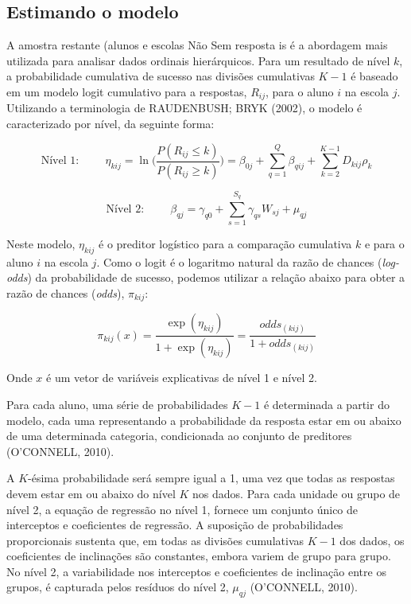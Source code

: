 \documentclass[
]{article}
\begin{document}
\hypertarget{estimando-o-modelo}{%
\subsection{Estimando o modelo}\label{estimando-o-modelo}}

A amostra restante (alunos e escolas Não Sem resposta is é a abordagem
mais utilizada para analisar dados ordinais hierárquicos. Para um
resultado de nível \(k\), a probabilidade cumulativa de sucesso nas
divisões cumulativas \(K-1\) é baseado em um modelo logit cumulativo
para a respostas, \(R_{ij}\), para o aluno \(i\) na escola \(j\).
Utilizando a terminologia de RAUDENBUSH; BRYK (2002), o modelo é
caracterizado por nível, da seguinte forma:

\[
\text{Nível 1:}  \hspace{1cm} \eta_{kij} = \ln{\Biggl(\frac{P(R_{ij} \leq k)}{P(R_{ij} \geq k)}\Biggl)} = \beta_{0j} + \sum_{q=1}^{Q} \beta_{qij} + \sum_{k=2}^{K-1} D_{kij}\rho_{k} 
\]

\[
\text{Nível 2:} \hspace{1cm} \beta_{qj} = \gamma_{q0} + \sum_{s=1}^{S_{q}} \gamma_{qs} W_{sj} + \mu_{qj}
\]

Neste modelo, \(\eta_{kij}\) é o preditor logístico para a comparação
cumulativa \(k\) e para o aluno \(i\) na escola \(j\). Como o logit é o
logaritmo natural da razão de chances (\emph{log-odds}) da probabilidade
de sucesso, podemos utilizar a relação abaixo para obter a razão de
chances (\emph{odds}), \(\pi_{kij}\):

\[
 \pi_{kij}(x) = \frac{\exp(\eta_{kij})}{1 + \exp(\eta_{kij})} = \frac{odds_{(kij)}}{1 + odds_{(kij)}}
\]

Onde \(x\) é um vetor de variáveis explicativas de nível 1 e nível 2.

Para cada aluno, uma série de probabilidades \(K-1\) é determinada a
partir do modelo, cada uma representando a probabilidade da resposta
estar em ou abaixo de uma determinada categoria, condicionada ao
conjunto de preditores (O'CONNELL, 2010).

A \(K\)-ésima probabilidade será sempre igual a 1, uma vez que todas as
respostas devem estar em ou abaixo do nível \(K\) nos dados. Para cada
unidade ou grupo de nível 2, a equação de regressão no nível 1, fornece
um conjunto único de interceptos e coeficientes de regressão. A
suposição de probabilidades proporcionais sustenta que, em todas as
divisões cumulativas \(K-1\) dos dados, os coeficientes de inclinações
são constantes, embora variem de grupo para grupo. No nível 2, a
variabilidade nos interceptos e coeficientes de inclinação entre os
grupos, é capturada pelos resíduos do nível 2, \(\mu_{qj}\) (O'CONNELL,
2010).
\end{document}
